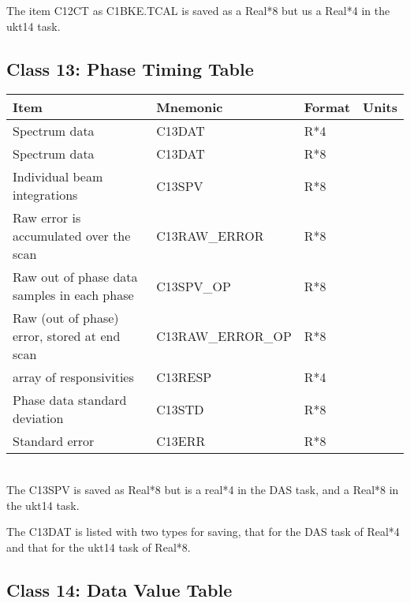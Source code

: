  The item C12CT as C1BKE.TCAL is saved as a Real*8 but us a Real*4 in the 
ukt14 task. 

                                                                      
                            
\subsection{Class 13: Phase Timing Table}


\begin{tabular}{||l|l|l|l||} \hline
Item                                                 & Mnemonic & Format & Units \\ \hline
Spectrum data                                        & C13DAT   & R*4    &  ~    \\      
Spectrum data                                        & C13DAT   & R*8    &  ~    \\      
Individual beam integrations                         & C13SPV   & R*8    &  ~   \\      
Raw error is accumulated over the scan               & C13RAW\_ERROR    & R*8    &  ~    \\      
Raw out of phase data samples in each phase          & C13SPV\_OP       & R*8    &  ~    \\      
Raw (out of phase) error, stored at end scan         & C13RAW\_ERROR\_OP & R*8    &  ~    \\      
array of responsivities                              & C13RESP  & R*4    &  ~    \\      
Phase data standard deviation                        & C13STD   & R*8    &  ~    \\      
Standard error                                       & C13ERR   & R*8    &  ~    \\ \hline
\end{tabular}
 \\

 The C13SPV is saved as Real*8 but is a real*4 in the DAS task, and
a Real*8 in the ukt14 task. 

 The C13DAT is listed with two types for saving, that for the DAS task
of Real*4 and that for the ukt14 task of Real*8.                                                                  
                                                              
        
\subsection{Class 14: Data Value Table}



